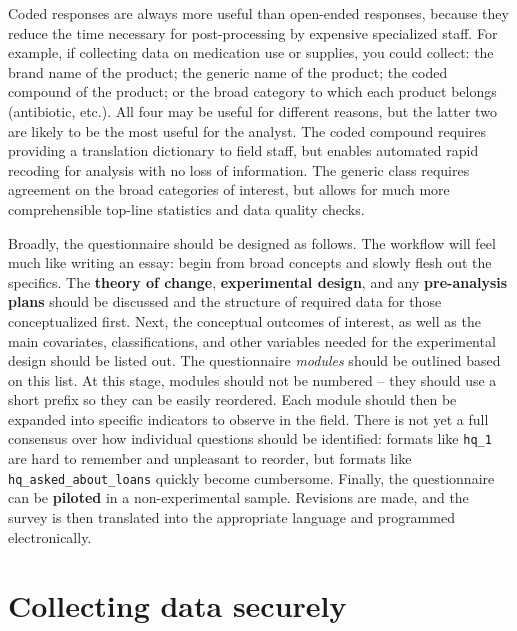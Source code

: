 Coded responses are always more useful than open-ended responses,
because they reduce the time necessary for post-processing by
expensive specialized staff.
For example, if collecting data on medication use or supplies,
you could collect: the brand name of the product;
the generic name of the product;
the coded compound of the product;
or the broad category to which each product belongs (antibiotic, etc.).
All four may be useful for different reasons,
but the latter two are likely to be the most useful for the analyst.
The coded compound requires providing a translation dictionary
to field staff, but enables automated rapid recoding for analysis
with no loss of information.
The generic class requires agreement on the broad categories of interest,
but allows for much more comprehensible top-line statistics and data quality checks.

Broadly, the questionnaire should be designed as follows.
The workflow will feel much like writing an essay:
begin from broad concepts and slowly flesh out the specifics.
The \textbf{theory of change}, \textbf{experimental design},
and any \textbf{pre-analysis plans} should be discussed
and the structure of required data for those conceptualized first.
Next, the conceptual outcomes of interest, as well as the main covariates, classifications,
and other variables needed for the experimental design should be listed out.
The questionnaire \textit{modules} should be outlined based on this list.
At this stage, modules should not be numbered --
they should use a short prefix so they can be easily reordered.
Each module should then be expanded into specific indicators to observe in the field.
There is not yet a full consensus over how individual questions should be identified:
formats like \texttt{hq\_1} are hard to remember and unpleasant to reorder,
but formats like \texttt{hq\_asked\_about\_loans} quickly become cumbersome.
Finally, the questionnaire can be \textbf{piloted}
in a non-experimental sample.
Revisions are made, and the survey is then translated into the appropriate language and programmed electronically.


\section{Collecting data securely}

